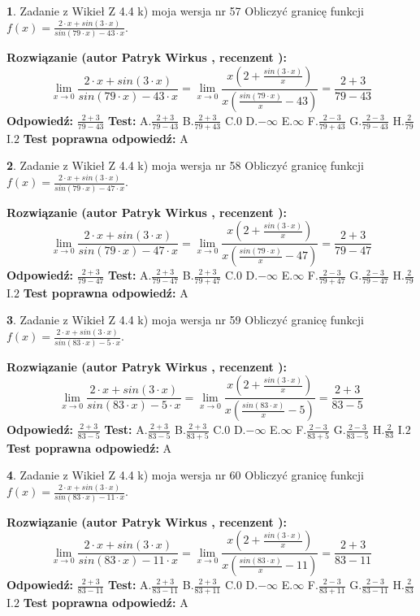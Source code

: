 \documentclass[12pt, a4paper]{article}
\theoremstyle{definition} %
\newtheorem{zad}{}
\newcommand{\zadStart}[1]{\begin{zad}#1\newline}
\newcommand{\zadStop}{\end{zad}}
\newcommand{\rozwStart}[2]{\noindent \textbf{Rozwiązanie (autor #1 , recenzent #2): }\newline}
\newcommand{\rozwStop}{\newline}
\newcommand{\odpStart}{\noindent \textbf{Odpowiedź:}\newline}
\newcommand{\odpStop}{\newline}
\newcommand{\testStart}{\noindent \textbf{Test:}\newline}
\newcommand{\testStop}{\newline}
\newcommand{\kluczStart}{\noindent \textbf{Test poprawna odpowiedź:}\newline}
\newcommand{\kluczStop}{\newline}
\begin{document}
\zadStart{Zadanie z Wikieł Z 4.4 k) moja wersja nr 57}
Obliczyć granicę funkcji $f(x)=\frac{2\cdot x +sin(3\cdot x)}{sin(79\cdot x) -43\cdot x}$.
\zadStop
\rozwStart{Patryk Wirkus}{}
$$\lim\limits_{x\to 0}\frac{2\cdot x +sin(3\cdot x)}{sin(79\cdot x) -43\cdot x}
=\lim\limits_{x\to 0}\frac{x(2+\frac{sin(3\cdot x)}{x})}{x(\frac{sin(79\cdot x)}{x}-43)}
=\frac{2+3}{79-43}$$
\rozwStop
\odpStart
$\frac{2+3}{79-43}$
\odpStop
\testStart
A.$\frac{2+3}{79-43}$
B.$\frac{2+3}{79+43}$
C.$0$
D.$-\infty$
E.$\infty$
F.$\frac{2-3}{79+43}$
G.$\frac{2-3}{79-43}$
H.$\frac{2}{79}$
I.$2$
\testStop
\kluczStart
A
\kluczStop



\zadStart{Zadanie z Wikieł Z 4.4 k) moja wersja nr 58}
Obliczyć granicę funkcji $f(x)=\frac{2\cdot x +sin(3\cdot x)}{sin(79\cdot x) -47\cdot x}$.
\zadStop
\rozwStart{Patryk Wirkus}{}
$$\lim\limits_{x\to 0}\frac{2\cdot x +sin(3\cdot x)}{sin(79\cdot x) -47\cdot x}
=\lim\limits_{x\to 0}\frac{x(2+\frac{sin(3\cdot x)}{x})}{x(\frac{sin(79\cdot x)}{x}-47)}
=\frac{2+3}{79-47}$$
\rozwStop
\odpStart
$\frac{2+3}{79-47}$
\odpStop
\testStart
A.$\frac{2+3}{79-47}$
B.$\frac{2+3}{79+47}$
C.$0$
D.$-\infty$
E.$\infty$
F.$\frac{2-3}{79+47}$
G.$\frac{2-3}{79-47}$
H.$\frac{2}{79}$
I.$2$
\testStop
\kluczStart
A
\kluczStop



\zadStart{Zadanie z Wikieł Z 4.4 k) moja wersja nr 59}
Obliczyć granicę funkcji $f(x)=\frac{2\cdot x +sin(3\cdot x)}{sin(83\cdot x) -5\cdot x}$.
\zadStop
\rozwStart{Patryk Wirkus}{}
$$\lim\limits_{x\to 0}\frac{2\cdot x +sin(3\cdot x)}{sin(83\cdot x) -5\cdot x}
=\lim\limits_{x\to 0}\frac{x(2+\frac{sin(3\cdot x)}{x})}{x(\frac{sin(83\cdot x)}{x}-5)}
=\frac{2+3}{83-5}$$
\rozwStop
\odpStart
$\frac{2+3}{83-5}$
\odpStop
\testStart
A.$\frac{2+3}{83-5}$
B.$\frac{2+3}{83+5}$
C.$0$
D.$-\infty$
E.$\infty$
F.$\frac{2-3}{83+5}$
G.$\frac{2-3}{83-5}$
H.$\frac{2}{83}$
I.$2$
\testStop
\kluczStart
A
\kluczStop



\zadStart{Zadanie z Wikieł Z 4.4 k) moja wersja nr 60}
Obliczyć granicę funkcji $f(x)=\frac{2\cdot x +sin(3\cdot x)}{sin(83\cdot x) -11\cdot x}$.
\zadStop
\rozwStart{Patryk Wirkus}{}
$$\lim\limits_{x\to 0}\frac{2\cdot x +sin(3\cdot x)}{sin(83\cdot x) -11\cdot x}
=\lim\limits_{x\to 0}\frac{x(2+\frac{sin(3\cdot x)}{x})}{x(\frac{sin(83\cdot x)}{x}-11)}
=\frac{2+3}{83-11}$$
\rozwStop
\odpStart
$\frac{2+3}{83-11}$
\odpStop
\testStart
A.$\frac{2+3}{83-11}$
B.$\frac{2+3}{83+11}$
C.$0$
D.$-\infty$
E.$\infty$
F.$\frac{2-3}{83+11}$
G.$\frac{2-3}{83-11}$
H.$\frac{2}{83}$
I.$2$
\testStop
\kluczStart
A
\kluczStop
\end{document}
